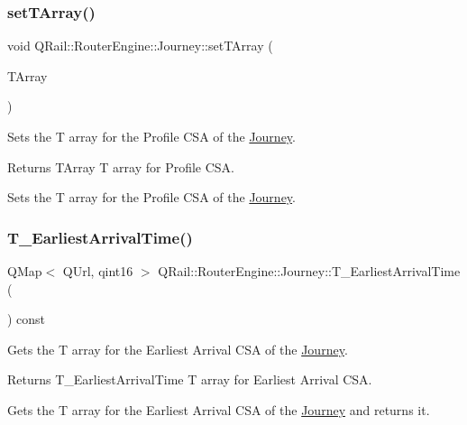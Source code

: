 \subsubsection{\texorpdfstring{setTArray()}{setTArray()}}
{\footnotesize\ttfamily void Q\+Rail\+::\+Router\+Engine\+::\+Journey\+::set\+T\+Array (\begin{DoxyParamCaption}\item[{const Q\+Map$<$ Q\+Url, \mbox{\hyperlink{classQRail_1_1RouterEngine_1_1TrainProfile}{Q\+Rail\+::\+Router\+Engine\+::\+Train\+Profile}} $\ast$ $>$ \&}]{T\+Array }\end{DoxyParamCaption})}



Sets the T array for the Profile C\+SA of the \mbox{\hyperlink{classQRail_1_1RouterEngine_1_1Journey}{Journey}}. 

\begin{DoxyReturn}{Returns}
T\+Array T array for Profile C\+SA.
\end{DoxyReturn}
Sets the T array for the Profile C\+SA of the \mbox{\hyperlink{classQRail_1_1RouterEngine_1_1Journey}{Journey}}. \mbox{\label{classQRail_1_1RouterEngine_1_1Journey_a2c6e80f1152cc373c95361db4fe295e4}} 
\subsubsection{\texorpdfstring{T\_EarliestArrivalTime()}{T\_EarliestArrivalTime()}}
{\footnotesize\ttfamily Q\+Map$<$ Q\+Url, qint16 $>$ Q\+Rail\+::\+Router\+Engine\+::\+Journey\+::\+T\+\_\+\+Earliest\+Arrival\+Time (\begin{DoxyParamCaption}{ }\end{DoxyParamCaption}) const}



Gets the T array for the Earliest Arrival C\+SA of the \mbox{\hyperlink{classQRail_1_1RouterEngine_1_1Journey}{Journey}}. 

\begin{DoxyReturn}{Returns}
T\+\_\+\+Earliest\+Arrival\+Time T array for Earliest Arrival C\+SA.
\end{DoxyReturn}
Gets the T array for the Earliest Arrival C\+SA of the \mbox{\hyperlink{classQRail_1_1RouterEngine_1_1Journey}{Journey}} and returns it. \mbox{\label{classQRail_1_1RouterEngine_1_1Journey_ab35795d36beaf773a9946c2b217ecca1}} 
